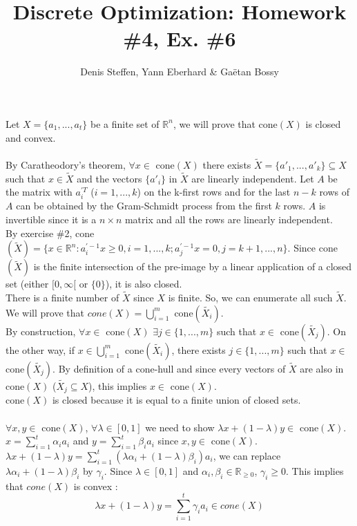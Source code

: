 \documentclass[a4paper,11pt,french]{article}
\title{Discrete Optimization: Homework \#4, Ex. \#6}
\author{Denis Steffen, Yann Eberhard \& Gaëtan Bossy}
\begin{document}
    
    \maketitle
    Let $X=\{ a_{1}, ... , a_{t}\}$ be a finite set of $\mathbb{R}^{n}$, we will prove that cone$(X)$ is closed and convex.
    \\
    \\
    By Caratheodory's theorem, $\forall x \in$ cone$(X)$ there exists $\widetilde{X}=\{ a'_{1}, ... , a'_{k}\} \subseteq X$ such that $x \in \widetilde{X}$ and the vectors $\{ a'_{i}\}$ in $\widetilde{X}$ are linearly independent. 
    Let $A$ be the matrix with $a_{i}^{\prime T}$ ($i=1, ... , k$) on the k-first rows and for the last $n-k$ rows of $A$ can be obtained by the Gram-Schmidt process from the first $k$ rows. $A$ is invertible since it is a $n \times n$ matrix and all the rows are linearly independent.
    \\
    By exercise \#2, cone$(\widetilde{X})=\{ x\in \mathbb{R}^{n} : a_{ i}^{\prime -1}x \geq 0, i=1, ... , k ; a_{j}^{\prime -1}x = 0, j=k+1, ... , n  \}$.
    Since cone$(\widetilde{X})$ is the finite intersection of the pre-image by a linear application of a closed set (either $[0, \infty[$ or $\{0\}$), it is also closed. 
    \\
    There is a finite number of $\widetilde{X}$ since $X$ is finite. So, we can enumerate all such $\widetilde{X}$. We will prove that $cone(X)=\displaystyle{\bigcup_{ i=1}^{m}}$ cone$(\widetilde{X_{i}})$. 
    \\
    By construction, $\forall x \in$ cone$(X)$ $\exists j \in \{1, ..., m\}$ such that $x \in$ cone$(\widetilde{X_{j}})$. On the other way, if $x \in \displaystyle{\bigcup_{ i=1}^{m}}$ cone$(\widetilde{X_{i}})$, there exists $j \in \{1, ... , m \}$ such that $x \in$ cone$(\widetilde{X_{j}})$. 
    By definition of a cone-hull and since every vectors of $\widetilde{X}$ are also in cone$(X)$ ($\widetilde{X_{j}} \subseteq X$), this implies $x \in$ cone$(X)$.
    \\
    cone$(X)$ is closed because it is equal to a finite union of closed sets.
    \\
    \\
    $\forall x, y \in$ cone$(X)$, $\forall \lambda \in [0,1]$ we need to show $\lambda 
    x +(1-\lambda)y \in$ cone$(X)$. $x=\displaystyle{\sum_{i=1}^{t}} \alpha_{i} a_{i}$ and $y=\displaystyle{\sum_{i=1}^{t}} \beta_{i} a_{i}$ since $x,y \in$ cone$(X)$.
    \\
    $\lambda x +(1-\lambda)y = \displaystyle{\sum_{i=1}^{t}} (\lambda \alpha_{i} + (1-\lambda)\beta_{i}) a_{i}$, we can replace $\lambda \alpha_{i} + (1-\lambda)\beta_{i}$ by $\gamma_{i}$. Since $\lambda \in [0,1]$ and $\alpha_{i}, \beta_{i} \in \mathbb{R}_{\geq 0}$, $\gamma_{i} \geq 0$. This implies that $cone(X)$ is convex :
    \begin{equation*}
    \lambda x +(1-\lambda)y = \displaystyle{\sum_{i=1}^{t}} \gamma_{i} a_{i} \in cone(X)
    \end{equation*}
    
    
    
\end{document}
